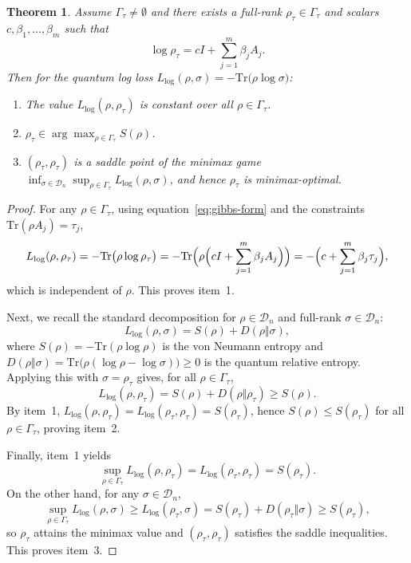 \documentclass{article}
\newtheorem{theorem}{Theorem}
\theoremstyle{plain}
\theoremstyle{definition}
\def\eqref#1{equation~\ref{#1}}
\begin{document}
\begin{appendices}
\begin{theorem}
\label{thm:gibbs-equalizer}
Assume $\Gamma_{\tau}\neq\emptyset$ and there exists a full-rank
$\rho_{\tau}\in\Gamma_{\tau}$ and scalars $c,\beta_1,\dots,\beta_m$ such that
\begin{equation}
\log \rho_{\tau}
=
cI+\sum_{j=1}^m \beta_j A_j.
\label{eq:gibbs-form}
\end{equation}
Then for the quantum log loss $L_{\log}(\rho,\sigma)=-\mathrm{Tr}\bigl(\rho\log\sigma\bigr)$:
\begin{enumerate}
\item  The value $L_{\log}(\rho,\rho_{\tau})$ is constant over all
$\rho\in\Gamma_{\tau}$.
\item $\rho_{\tau}\in\arg\max_{\rho\in\Gamma_{\tau}} S(\rho)$.
\item  $(\rho_{\tau},\rho_{\tau})$ is a saddle point of the minimax game
$\inf_{\sigma\in\mathcal{D}_n}\sup_{\rho\in\Gamma_{\tau}} L_{\log}(\rho,\sigma)$, and hence
$\rho_{\tau}$ is minimax-optimal.
\end{enumerate}
\end{theorem}

\begin{proof}
For any $\rho\in\Gamma_{\tau}$, using \eqref{eq:gibbs-form} and the constraints
$\mathrm{Tr}(\rho A_j)=\tau_j$,
\[
L_{\log}(\rho,\rho_{\tau})
=
-\mathrm{Tr}\bigl(\rho\log\rho_{\tau}\bigr)
=
-\mathrm{Tr}\Bigl(\rho\Bigl(cI+\sum_{j=1}^m\beta_j A_j\Bigr)\Bigr)
=
-\Bigl(c+\sum_{j=1}^m\beta_j\tau_j\Bigr),
\]
which is independent of $\rho$. This proves item~1.

Next, we recall the standard decomposition for $\rho\in\mathcal{D}_n$ and full-rank
$\sigma\in\mathcal{D}_n$:
\[
L_{\log}(\rho,\sigma)
=
S(\rho)+D(\rho\Vert\sigma),
\]
where $S(\rho)=-\mathrm{Tr}(\rho\log\rho)$ is the von Neumann entropy and
$D(\rho\Vert\sigma)=\mathrm{Tr}\bigl(\rho(\log\rho-\log\sigma)\bigr)\ge 0$ is the
quantum relative entropy. Applying this with $\sigma=\rho_{\tau}$ gives, for all
$\rho\in\Gamma_{\tau}$,
\[
L_{\log}(\rho,\rho_{\tau})
=
S(\rho)+D(\rho\Vert\rho_{\tau})
\ge
S(\rho).
\]
By item~1, $L_{\log}(\rho,\rho_{\tau})=L_{\log}(\rho_{\tau},\rho_{\tau})=S(\rho_{\tau})$,
hence $S(\rho)\le S(\rho_{\tau})$ for all $\rho\in\Gamma_{\tau}$, proving item~2.

Finally, item~1 yields
\[
\sup_{\rho\in\Gamma_{\tau}} L_{\log}(\rho,\rho_{\tau})
=
L_{\log}(\rho_{\tau},\rho_{\tau})
=
S(\rho_{\tau}).
\]
On the other hand, for any $\sigma\in\mathcal{D}_n$,
\[
\sup_{\rho\in\Gamma_{\tau}} L_{\log}(\rho,\sigma)
\ge
L_{\log}(\rho_{\tau},\sigma)
=
S(\rho_{\tau})+D(\rho_{\tau}\Vert\sigma)
\ge
S(\rho_{\tau}),
\]
so $\rho_{\tau}$ attains the minimax value and $(\rho_{\tau},\rho_{\tau})$ satisfies
the saddle inequalities. This proves item~3.
\end{proof}


\end{appendices}
\end{document}
